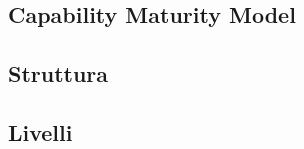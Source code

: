 \documentclass[../PianoDiQualifica.tex]{subfiles}
\begin{document}
\begin{appendices}

\section{Capability Maturity Model}
	\subsection{Struttura}
	
	\subsection{Livelli}
	
\end{appendices}
\end{document}
